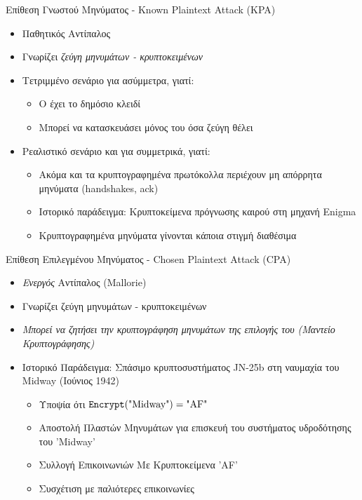 \documentclass[handout]{beamer}
\begin{document}
\begin{frame}{Επίθεση Γνωστού Μηνύματος -  Known Plaintext Attack (KPA)}
\begin{itemize}
\item Παθητικός Αντίπαλος
\item Γνωρίζει \emph{ζεύγη μηνυμάτων - κρυπτοκειμένων}
\item Τετριμμένο σενάριο για ασύμμετρα, γιατί: \pause
\begin{itemize}
	\item O \adv έχει το δημόσιο κλειδί
	\item Μπορεί να κατασκευάσει μόνος του όσα ζεύγη θέλει
\end{itemize} \pause
\item Ρεαλιστικό σενάριο και για συμμετρικά, γιατί: \pause
\begin{itemize}
\item Ακόμα και τα κρυπτογραφημένα πρωτόκολλα περιέχουν μη απόρρητα μηνύματα (handshakes, ack)
\item Ιστορικό παράδειγμα: Κρυπτοκείμενα πρόγνωσης καιρού στη μηχανή Enigma
\item Κρυπτογραφημένα μηνύματα γίνονται κάποια στιγμή διαθέσιμα
\end{itemize} 
\end{itemize} 
\end{frame}

\begin{frame}{Επίθεση Επιλεγμένου Μηνύματος - Chosen Plaintext Attack (CPA)}
 
\begin{itemize}
\item \emph{Ενεργός} Αντίπαλος (Mallorie)
\item Γνωρίζει ζεύγη μηνυμάτων - κρυπτοκειμένων
\item \emph{Μπορεί να ζητήσει την κρυπτογράφηση μηνυμάτων της επιλογής του (Μαντείο Κρυπτογράφησης)} \pause
\item Ιστορικό Παράδειγμα: Σπάσιμο κρυπτοσυστήματος JN-25b στη ναυμαχία του Midway (Ιούνιος 1942)
\begin{itemize}
	\item Υποψία ότι $\mathtt{Encrypt}(\text{"Midway"}) = \text{"AF"}$
	\item Αποστολή Πλαστών Μηνυμάτων για επισκευή του συστήματος υδροδότησης του 'Midway'
	\item Συλλογή Επικοινωνιών Με Κρυπτοκείμενα 'AF'
	\item Συσχέτιση με παλιότερες επικοινωνίες
\end{itemize}
\end{itemize}
\end{frame}
\end{document}
